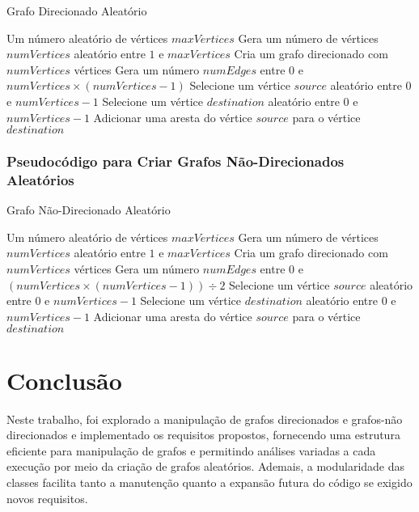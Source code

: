 \documentclass[12pt]{article}
\begin{document}
\begin{algorithm}
    \caption{Grafo Direcionado Aleatório}
    \label{alg:createRandomDirectedGraph}
    \begin{algorithmic}
        \Require Um número aleatório de vértices $maxVertices$
        \State Gera um número de vértices $numVertices$ aleatório entre $1$ e $maxVertices$
        \State Cria um grafo direcionado com $numVertices$ vértices
        \State Gera um número $numEdges$ entre $0$ e $numVertices \times (numVertices - 1)$
            \State Selecione um vértice $source$ aleatório entre $0$ e $numVertices-1$
            \State Selecione um vértice $destination$ aleatório entre $0$ e $numVertices-1$
                \State Adicionar uma aresta do vértice $source$ para o vértice $destination$
            \EndIf
        \EndFor
    \end{algorithmic}
\end{algorithm}


\subsubsection{Pseudocódigo para Criar Grafos Não-Direcionados Aleatórios}

\begin{algorithm}
    \caption{Grafo Não-Direcionado Aleatório}
    \label{alg:createRandomUndirectedGraph}
    \begin{algorithmic}
        \Require Um número aleatório de vértices $maxVertices$
        \State Gera um número de vértices $numVertices$ aleatório entre $1$ e $maxVertices$
        \State Cria um grafo direcionado com $numVertices$ vértices
        \State Gera um número $numEdges$ entre $0$ e $(numVertices \times (numVertices - 1)) \div 2$
            \State Selecione um vértice $source$ aleatório entre $0$ e $numVertices-1$
            \State Selecione um vértice $destination$ aleatório entre $0$ e $numVertices-1$
                \State Adicionar uma aresta do vértice $source$ para o vértice $destination$
            \EndIf
        \EndFor
    \end{algorithmic}
\end{algorithm}

\section{Conclusão}

Neste trabalho, foi explorado a manipulação de grafos direcionados e grafos-não direcionados e implementado os requisitos propostos, fornecendo uma estrutura eficiente para manipulação de grafos e permitindo análises variadas a cada execução por meio da criação de grafos aleatórios. Ademais, a modularidade das classes facilita tanto a manutenção quanto a expansão futura do código se exigido novos requisitos.



%
%
\end{document}
